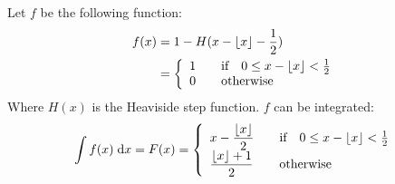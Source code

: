 \documentclass[11pt,a4paper,oneside]{report}
\begin{document}
\author{Jonathan Dupuy}

Let $f$ be the following function:
\begin{align*}
	f(x) &= 1 - H(x - \lfloor x \rfloor - \frac{1}{2}) \\
	     &= \left\{
  \begin{array}{l l}
	1 & \quad \text{if} \quad 0 \leq x - \lfloor x \rfloor < \frac{1}{2} \\
	0 & \quad \text{otherwise}\\
  \end{array} \right.
\end{align*}
Where $H(x)$ is the Heaviside step function. 
$f$ can be integrated: 
\begin{equation*}
	\int f(x) \; \mathrm{d}x =  F(x) = 
	\left\{
	\begin{array}{l l}
	\displaystyle x - \frac{\lfloor x \rfloor}{2} & \quad \text{if} \quad 0 \leq x - \lfloor x \rfloor < \frac{1}{2} \\
	\displaystyle \frac{\lfloor x \rfloor + 1}{2} & \quad \text{otherwise}\\
	\end{array} \right.
\end{equation*}
\end{document}
